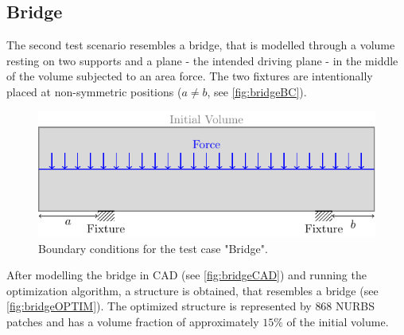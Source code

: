 \subsection{Bridge}
\label{ssec:bridge}
The second test scenario resembles a bridge, that is modelled through a volume resting on two supports and a plane - the intended driving plane - in the middle of the volume subjected to an area force. The two fixtures are intentionally placed at non-symmetric positions ($a\neq b$, see \autoref{fig:bridgeBC}).
\begin{figure}[H]
\begin{center}
\includegraphics[scale=1]{Pictures/tikzBridge/bridge.pdf}
\end{center}
\caption{Boundary conditions for the test case "Bridge".}
\label{fig:bridgeBC}
\end{figure}
After modelling the bridge in CAD (see \autoref{fig:bridgeCAD}) and running the optimization algorithm, a structure is obtained, that resembles a bridge (see \autoref{fig:bridgeOPTIM}). The optimized structure is represented by $868$ NURBS patches and has a volume fraction of approximately $15\%$ of the initial volume.\enlargethispage{1cm}
